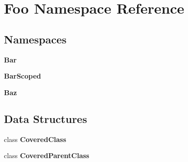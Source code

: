 \section{Foo Namespace Reference}
\label{namespace_foo}
\subsection*{Namespaces}
\begin{DoxyCompactItemize}
\item 
 {\bf Bar}
\item 
 {\bf Bar\+Scoped}
\item 
 {\bf Baz}
\end{DoxyCompactItemize}
\subsection*{Data Structures}
\begin{DoxyCompactItemize}
\item 
class {\bf Covered\+Class}
\item 
class {\bf Covered\+Parent\+Class}
\end{DoxyCompactItemize}
